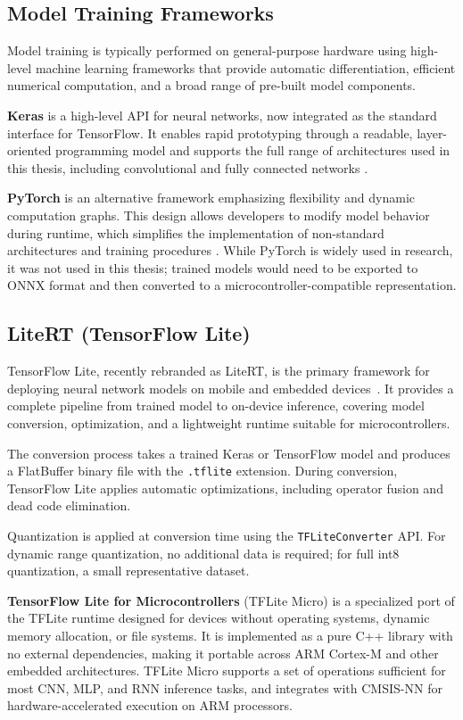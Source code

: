 \subsection{Model Training Frameworks}

Model training is typically performed on general-purpose hardware using high-level machine learning frameworks that provide automatic differentiation, efficient numerical computation, and a broad range of pre-built model components.

\textbf{Keras} is a high-level API for neural networks, now integrated as the standard interface for TensorFlow. It enables rapid prototyping through a readable, layer-oriented programming model and supports the full range of architectures used in this thesis, including convolutional and fully connected networks \cite{tensorflowkeras}. 

\textbf{PyTorch} is an alternative framework emphasizing flexibility and dynamic computation graphs. This design allows developers to modify model behavior during runtime,  which simplifies the implementation of non-standard architectures and training procedures \cite{paszke2019pytorch}. While PyTorch is widely used in research, it was not used in this thesis; trained models would need to be exported to ONNX format and then converted to a microcontroller-compatible representation.

\subsection{LiteRT (TensorFlow Lite)}

TensorFlow Lite, recently rebranded as LiteRT, is the primary framework for deploying neural network models on mobile and embedded devices~\cite{litert}. It provides a complete pipeline from trained model to on-device inference, covering model conversion, optimization, and a lightweight runtime suitable for microcontrollers.

The conversion process takes a trained Keras or TensorFlow model and produces a FlatBuffer binary file with the \texttt{.tflite} extension. During conversion, TensorFlow Lite applies automatic optimizations, including operator fusion and dead code elimination.

Quantization is applied at conversion time using the \texttt{TFLiteConverter} API. For dynamic range quantization, no additional data is required; for full int8 quantization, a small representative dataset.

\textbf{TensorFlow Lite for Microcontrollers} (TFLite Micro) is a specialized port of the TFLite runtime designed for devices without operating systems, dynamic memory allocation, or file systems. It is implemented as a pure C++ library with no external dependencies, making it portable across ARM Cortex-M and other embedded architectures. TFLite Micro supports a set of operations sufficient for most CNN, MLP, and RNN inference tasks, and integrates with CMSIS-NN for hardware-accelerated execution on ARM processors.

